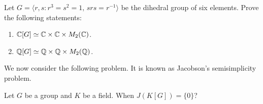 \begin{exercise}
	Let $G=\langle r,s:r^3=s^2=1,\,srs=r^{-1}\rangle$ be the dihedral group of six elements. 
	Prove the following statements:
	\begin{enumerate}
	    \item $\mathbb{C}[G]\simeq\mathbb{C}\times\mathbb{C}\times M_2(\mathbb{C})$.
	    \item $\mathbb{Q}[G]\simeq\mathbb{Q}\times\mathbb{Q}\times M_2(\mathbb{Q})$.
	\end{enumerate}  
\end{exercise}

We now consider the following problem. It is known as Jacobson's semisimplicity problem. 

\begin{openproblem}
\label{Jacobson's semisimplicity problem}
Let $G$ be a group and $K$ be a field. When $J(K[G])=\{0\}$?
\end{openproblem}

